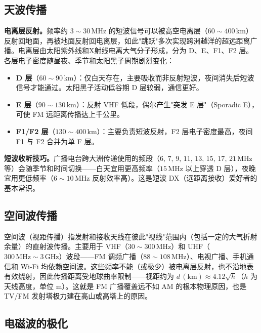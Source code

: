 \documentclass[12pt,UTF8]{ctexbook}
\begin{document}
\subsection{天波传播}

\textbf{电离层反射。}频率约 $3\sim30\,\mathrm{MHz}$ 的短波信号可以被高空电离层（$60\sim400\,\mathrm{km}$）反射回地面，再被地面反射回电离层，如此"跳跃"多次实现跨洲越洋的超远距离广播。电离层由太阳紫外线和X射线电离大气分子形成，分为 D、E、F1、F2 层。各层电子密度随昼夜、季节和太阳黑子周期剧烈变化：

\begin{itemize}
  \item \textbf{D 层}（$60\sim90\,\mathrm{km}$）：仅白天存在，主要吸收而非反射短波，夜间消失后短波信号才能通过。太阳黑子活动低谷期 D 层较弱，通信更好。
  \item \textbf{E 层}（$90\sim130\,\mathrm{km}$）：反射 VHF 低段，偶尔产生"突发 E 层"（Sporadic E），可使 FM 远距离传播达上千公里。
  \item \textbf{F1/F2 层}（$130\sim400\,\mathrm{km}$）：主要负责短波反射，F2 层电子密度最高，夜间 F1 与 F2 合并为单 F 层。
\end{itemize}

\textbf{短波收听技巧。}广播电台跨大洲传递使用的频段（$6,\,7,\,9,\,11,\,13,\,15,\,17,\,21\,\mathrm{MHz}$ 等）会随季节和时间切换——白天宜用更高频率（$15\,\mathrm{MHz}$ 以上穿透 D 层），夜晚宜用更低频率（$6\sim10\,\mathrm{MHz}$ 反射效率高）。这是短波 DX（远距离接收）爱好者的基本常识。

\subsection{空间波传播}

空间波（视距传播）指发射和接收天线在彼此"视线"范围内（包括一定的大气折射余量）的直射波传播。主要用于 VHF（$30\sim300\,\mathrm{MHz}$）和 UHF（$300\,\mathrm{MHz}\sim3\,\mathrm{GHz}$）波段——FM 调频广播（$88\sim108\,\mathrm{MHz}$）、电视广播、手机通信和 Wi-Fi 均依赖空间波。这些频率不能（或极少）被电离层反射，也不沿地表有效绕射，因此传播距离受地球曲率限制——视距约为 $d\,(\mathrm{km}) \approx 4.12\sqrt{h}$（$h$ 为天线高度，单位 m）。这就是 FM 广播覆盖远不如 AM 的根本物理原因，也是 TV/FM 发射塔极力建在高山或高塔上的原因。

\subsection{电磁波的极化}
\end{document}

